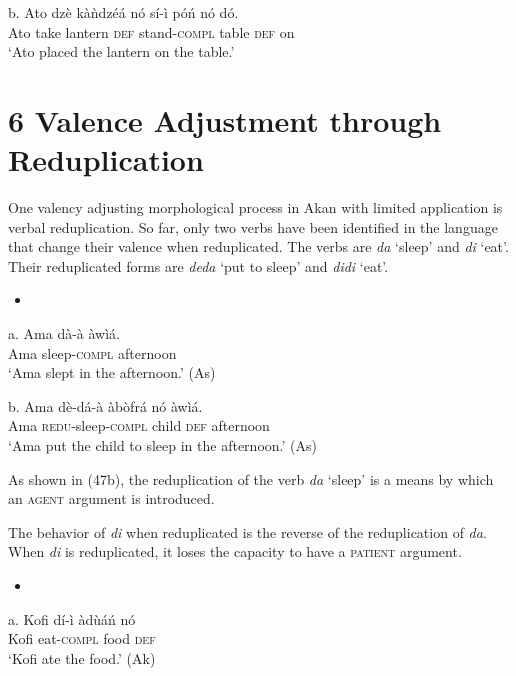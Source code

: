 \documentclass[output=paper]{langsci/langscibook}
\begin{document}
\gll  b.  Ato  dz\`{e}  k\`{a}\`{n}dz\'{e}\'{a}  n\'{o}  s\'{i}-\`{i}    p\'{o}\'{n}  n\'{o}  d\'{o}.\\
       Ato  take  lantern    \textsc{def}  stand-\textsc{compl}  table  \textsc{def}  on\\
\glt ‘Ato placed the lantern on the table.’
\z

\chapter[6  Valence Adjustment through Reduplication  ]{6  Valence Adjustment through Reduplication  }

One valency adjusting morphological process in Akan with limited application is verbal reduplication. So far, only two verbs have been identified in the language that change their valence when reduplicated. The verbs are \emph{da} ‘sleep’ and \emph{di} ‘eat’. Their reduplicated forms are \emph{deda} ‘put to sleep’ and \emph{didi} ‘eat’.

\begin{itemize}
\item \end{itemize}
\gll a.  Ama  d\`{a}-\`{a}    \`{a}w\`{i}\'{a}.\\
       Ama  sleep-\textsc{compl}  afternoon\\
\glt   ‘Ama slept in the afternoon.’ (As)
\z

\gll  b.  Ama  d\`{e}-d\'{a}-\`{a}    \`{a}b\`{o}fr\'{a}    n\'{o}  \`{a}w\`{i}\'{a}.\\
       Ama  \textsc{redu}{}-sleep\textsc{{}-compl}  child    \textsc{def}  afternoon\\
\glt   ‘Ama put the child to sleep in the afternoon.’ (As)
\z

As shown in (47b), the reduplication of the verb \emph{da} ‘sleep’ is a means by which an \textsc{agent} argument is introduced.

The behavior of \emph{di} when reduplicated is the reverse of the reduplication of \emph{da}. When \emph{di} is reduplicated, it loses the capacity to have a \textsc{patient} argument.

\begin{itemize}
\item \end{itemize}
\gll a.  Kofi  d\'{i}-\`{i}    \`{a}d\`{u}\'{a}\'{n}    n\'{o}\\
       Kofi  eat-\textsc{compl}  food    \textsc{def}\\
\glt   ‘Kofi ate the food.’ (Ak)
\z
\end{document}
